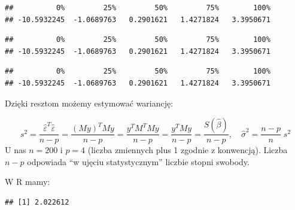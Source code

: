 \documentclass[]{article}
\newenvironment{Shaded}{\begin{snugshade}}{\end{snugshade}}
\newcommand{\KeywordTok}[1]{\textcolor[rgb]{0.13,0.29,0.53}{\textbf{#1}}}
\newcommand{\DecValTok}[1]{\textcolor[rgb]{0.00,0.00,0.81}{#1}}
\newcommand{\StringTok}[1]{\textcolor[rgb]{0.31,0.60,0.02}{#1}}
\newcommand{\OperatorTok}[1]{\textcolor[rgb]{0.81,0.36,0.00}{\textbf{#1}}}
\newcommand{\NormalTok}[1]{#1}
\begin{document}
\begin{verbatim}
##          0%         25%         50%         75%        100% 
## -10.5932245  -1.0689763   0.2901621   1.4271824   3.3950671
\end{verbatim}

\begin{Shaded}
\end{Shaded}

\begin{verbatim}
##          0%         25%         50%         75%        100% 
## -10.5932245  -1.0689763   0.2901621   1.4271824   3.3950671
\end{verbatim}

\begin{Shaded}
\end{Shaded}

\begin{verbatim}
##          0%         25%         50%         75%        100% 
## -10.5932245  -1.0689763   0.2901621   1.4271824   3.3950671
\end{verbatim}

Dzięki resztom możemy estymować wariancję:

\[s^2 = \frac{\hat{\varepsilon} ^T \hat{\varepsilon}}{n-p} = \frac{(My)^T My}{n-p} = \frac{y^T M^TMy}{n-p}= \frac{y ^T My}{n-p} = \frac{S(\hat{\beta})}{n-p},\quad
    \hat\sigma^2 = \frac{n-p}{n}\;s^2\] U nas \(n=200\) i \(p=4\)
(liczba zmiennych plus 1 zgodnie z konwencją). Liczba \(n-p\) odpowiada
``w ujęciu statystycznym'' liczbie stopni swobody.

W R mamy:

\begin{Shaded}
\end{Shaded}

\begin{verbatim}
## [1] 2.022612
\end{verbatim}
\end{document}
